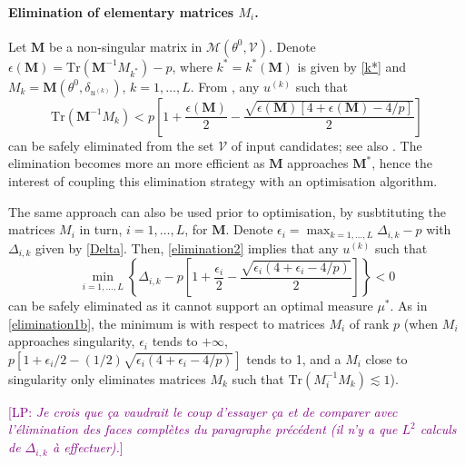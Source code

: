 \documentclass[a4paper]{article}
\newcommand{\LP}[1]{{\textcolor{purple}{[LP: \textit{#1}]}}}
\newcommand{\Luc}{\color{magenta} }
\theoremstyle{definition}
\theoremstyle{remark}
\newcommand{\Tr}{\mathrm{Tr}}
\newcommand{\V}{\mathcal{V}}
\newcommand{\Mb}{\mathbf{M}}
\renewcommand{\S}{\mathcal{S}}
\begin{document}
\paragraph{Elimination of elementary matrices $M_i$.} 
{\Luc 

Let $\Mb$ be a non-singular matrix in $\mathcal{M}(\theta^0,\V)$.
Denote $\epsilon(\Mb)=\Tr( \Mb^{-1}M_{k^*} )-p$, where $k^*=k^*(\Mb)$ is given by \eqref{k*} and $M_k=\Mb(\theta^0,\delta_{u^{(k)}})$, $k=1,\ldots,L$. From \cite[Th.~3]{HarmanT2009}, any $u^{(k)}$ such that
\begin{equation}\label{elimination2}
    \Tr(\Mb^{-1}M_k) < p \left[1+\frac{\epsilon(\Mb)}{2} - \frac{\sqrt{\epsilon(\Mb)[4+\epsilon(\Mb)-4/p]}}{2} \right]
\end{equation}
can be safely eliminated from the set $\V$ of input candidates; see also \cite{HPa06_SPL}. The elimination becomes more an more efficient as $\Mb$ approaches $\Mb^*$, hence the interest of coupling this elimination strategy with an optimisation algorithm. 

The same approach can also be used prior to optimisation, by susbtituting the matrices $M_i$ in turn, $i=1,\ldots,L$, for $\Mb$. Denote $\epsilon_i=\max_{k=1,\ldots,L} \Delta_{i,k}-p$ with $\Delta_{i,k}$ given by \eqref{Delta}. Then, \eqref{elimination2} implies that any $u^{(k)}$ such that 
$$
\min_{i=1,\ldots,L} \left\{ \Delta_{i,k} - p \left[1+\frac{\epsilon_i}{2} - \frac{\sqrt{\epsilon_i(4+\epsilon_i-4/p)}}{2} \right] \right\} <0
$$
can be safely eliminated as it cannot support an optimal measure $\mu^*$. As in \eqref{elimination1b}, the minimum is with respect to matrices $M_i$ of rank $p$ (when $M_i$ approaches singularity, $\epsilon_i$ tends to $+\infty$, $p [1+\epsilon_i/2 - (1/2)\sqrt{\epsilon_i(4+\epsilon_i-4/p)}]$ tends to 1, and a $M_i$ close to singularity only eliminates matrices $M_k$ such that $\Tr(M_i^{-1}M_k) \lesssim 1$). 


\LP{Je crois que ça vaudrait le coup d'essayer ça et de comparer avec l'élimination des faces complètes du paragraphe précédent (il n'y a que $L^2$ calculs de $\Delta_{i,k}$ à effectuer).}
}
\end{document}
